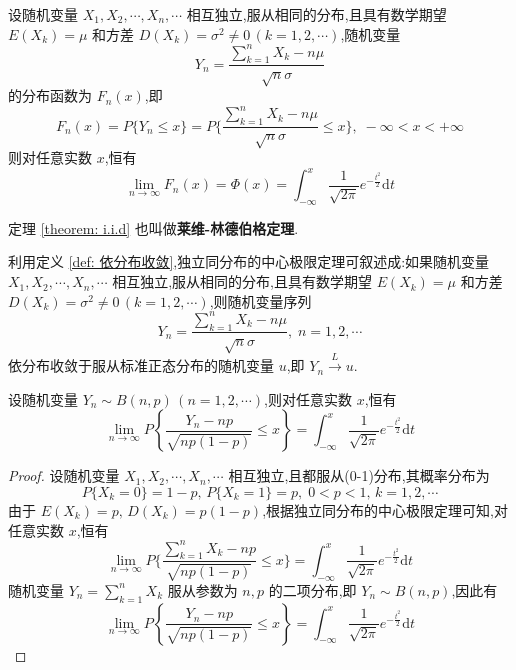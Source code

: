 \begin{theorem}[][独立同分布的中心极限定理] \label{theorem: i.i.d}
    设随机变量 $X_1,X_2,\cdots,X_n,\cdots$ 相互独立,服从相同的分布,且具有数学期望 $E(X_k) = \mu$ 和方差 $D(X_k) = \sigma^2 \not= 0 \, (k=1,2,\cdots)$,随机变量
    $$
    Y_n = \dfrac{\displaystyle\sum_{k=1}^n X_k - n \mu}{\sqrt{n} \sigma}
    $$
    的分布函数为 $F_n(x)$,即
    $$
    F_n(x) = P \{ Y_n \leqslant x \} = P \Bigg\{ \dfrac{\displaystyle\sum_{k=1}^n X_k - n \mu}{\sqrt{n} \sigma} \leqslant x \Bigg\}, \; -\infty < x < +\infty
    $$
    则对任意实数 $x$,恒有
    $$
    \lim_{n \to \infty} F_n(x) = \varPhi(x) = \int_{-\infty}^x \dfrac{1}{\sqrt{2\pi}} e^{-\frac{t^2}{2}} \text{d}t
    $$
\end{theorem}

定理 \ref{theorem: i.i.d} 也叫做\textbf{莱维-林德伯格定理}.

利用定义 \ref{def: 依分布收敛},独立同分布的中心极限定理可叙述成:如果随机变量 $X_1,X_2,\cdots,X_n,\cdots$ 相互独立,服从相同的分布,且具有数学期望 $E(X_k) = \mu$ 和方差 $D(X_k) = \sigma^2 \not= 0 \, (k=1,2,\cdots)$,则随机变量序列
$$
Y_n = \dfrac{\displaystyle\sum_{k=1}^n X_k - n \mu}{\sqrt{n} \sigma}, \; n=1,2,\cdots
$$
依分布收敛于服从标准正态分布的随机变量 $u$,即 $Y_n \overset{L}{\longrightarrow} u$.

\begin{theorem} \label{theorem: 棣莫弗-拉普拉斯极限定理}
    设随机变量 $Y_n \sim B(n,p) \, (n=1,2,\cdots)$,则对任意实数 $x$,恒有
    $$
    \lim_{n \to \infty} P \left\{ \dfrac{Y_n - np}{\sqrt{np(1-p)}} \leqslant x \right\} = \int_{-\infty}^x \dfrac{1}{\sqrt{2\pi}} e^{-\frac{t^2}{2}} \text{d}t
    $$
\end{theorem}

\begin{proof}
    设随机变量 $X_1,X_2,\cdots,X_n,\cdots$ 相互独立,且都服从(0-1)分布,其概率分布为
    $$
    P \{ X_k=0 \} = 1-p, \, P \{ X_k=1 \} = p, \; 0 < p < 1, \, k=1,2,\cdots
    $$
    由于 $E(X_k) = p, \, D(X_k) = p(1-p)$,根据独立同分布的中心极限定理可知,对任意实数 $x$,恒有
    $$
    \lim_{n \to \infty} P \Bigg\{ \dfrac{\displaystyle\sum_{k=1}^n X_k - np}{\sqrt{np(1-p)}} \leqslant x \Bigg\} = \int_{-\infty}^x \dfrac{1}{\sqrt{2\pi}} e^{-\frac{t^2}{2}} \text{d}t
    $$
    随机变量 $Y_n = \displaystyle\sum_{k=1}^n X_k$ 服从参数为 $n,p$ 的二项分布,即 $Y_n \sim B(n,p)$,因此有
    $$
    \lim_{n \to \infty} P \left\{ \dfrac{Y_n - np}{\sqrt{np(1-p)}} \leqslant x \right\} = \int_{-\infty}^x \dfrac{1}{\sqrt{2\pi}} e^{-\frac{t^2}{2}} \text{d}t
    $$
\end{proof}

